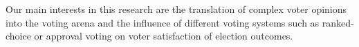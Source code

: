 Our main interests in this research are the translation of complex voter opinions into the voting arena and the influence of different voting systems such as ranked-choice or approval voting on voter satisfaction of election outcomes.
\\
\\
\\
\\

\cite{hoyer1974comparing}
